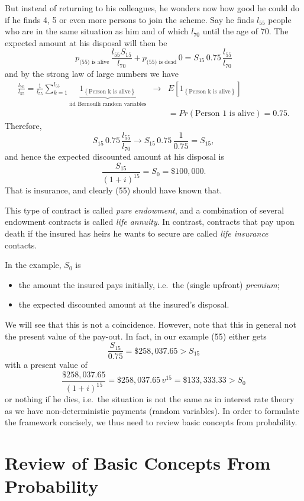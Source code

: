 \documentclass[11pt,fleqn,oneside]{book}
\begin{document}
But instead of returning to his colleagues, he wonders now how good he could do if he finds 4, 5 or even more persons to join the scheme. Say he finds $l_{55}$ people who are in the same situation as him and of which $l_{70}$ until the age of 70. The expected amount at his disposal will then be
$$
p_{\text{(55) is alive}} \, \frac{l_{55} S_{15}}{l_{70}} + p_{\text{(55) is dead}}\,  0 = S_{15} \, 0.75 \, \frac{l_{55}}{l_{70}} 
$$
and by the strong law of large numbers we have 
\begin{eqnarray*}
\frac{l_{70}}{l_{55}} = \frac{1}{l_{55}} \sum_{k=1}^{l_{55}} \underbrace{1_{\left\{\text{Person k is alive}\right\}}}_{\text{iid Bernoulli random variables}} &\rightarrow& E\left[1_{\left\{\text{Person k is alive}\right\}}\right]
\\
&& = Pr(\text{Person 1 is alive}) = 0.75.
\end{eqnarray*}
Therefore,
$$
S_{15} \, 0.75\,  \frac{l_{55}}{l_{70}} \rightarrow S_{15} \, 0.75 \, \frac{1}{0.75} = S_{15},
$$
and hence the expected discounted amount at his disposal is 
$$
\frac{S_{15}}{(1+i)^{15}} = S_0 = \$100,000.
$$
That is insurance, and clearly (55) should have known that.

This type of contract is called \textit{pure endowment}, and a combination of several endowment contracts is called \textit{life annuity}. In contrast, contracts that pay upon death if the insured has heirs he wants to secure are called \textit{life insurance} contacts.

In the example, $S_0$ is
\begin{itemize}
\item the amount the insured pays initially, i.e.\ the (single upfront) \textit{premium};
\item the expected discounted amount at the insured's disposal.
\end{itemize}
We will see that this is not a coincidence. However, note that this in general not the present value of the pay-out. In fact, in our example (55) either gets
$$
\frac{S_{15}}{0.75} = \$ 258,037.65 > S_{15}
$$
with a present value of 
$$
\frac{\$ 258,037.65}{(1+i)^{15}} = \$ 258,037.65 \, v^{15} = \$ 133,333.33 > S_0
$$
or nothing if he dies, i.e.\ the situation is not the same as in interest rate theory as we have non-deterministic payments (random variables). In order to formulate the framework concisely, we thus need to review basic concepts from probability. 

\section{Review of Basic Concepts From Probability}
\label{SECINPROBREV}
\end{document}
